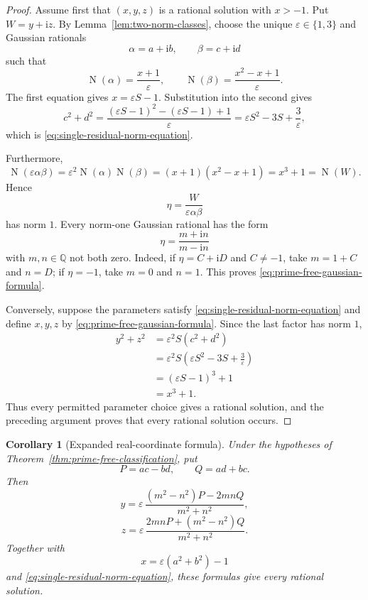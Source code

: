 \documentclass[11pt,a4paper]{article}
\numberwithin{equation}{section}
\newtheorem{corollary}[theorem]{Corollary}
\theoremstyle{definition}
\newcommand{\Q}{\mathbb Q}
\newcommand{\ii}{\mathrm i}
\newcommand{\N}{\operatorname N}
\begin{document}
\begin{proof}
Assume first that $(x,y,z)$ is a rational solution with $x>-1$.  Put
$W=y+\ii z$.  By Lemma~\ref{lem:two-norm-classes}, choose the unique
$\varepsilon\in\{1,3\}$ and Gaussian rationals
\[
 \alpha=a+\ii b,
 \qquad
 \beta=c+\ii d
\]
such that
\begin{equation}
 \N(\alpha)=\frac{x+1}{\varepsilon},
 \qquad
 \N(\beta)=\frac{x^2-x+1}{\varepsilon}.
 \label{eq:alpha-beta-norms}
\end{equation}
The first equation gives $x=\varepsilon S-1$.  Substitution into the second
gives
\[
 c^2+d^2
 =\frac{(\varepsilon S-1)^2-(\varepsilon S-1)+1}{\varepsilon}
 =\varepsilon S^2-3S+\frac3\varepsilon,
\]
which is \eqref{eq:single-residual-norm-equation}.

Furthermore,
\[
 \N(\varepsilon\alpha\beta)
 =\varepsilon^2\N(\alpha)\N(\beta)
 =(x+1)(x^2-x+1)
 =x^3+1
 =\N(W).
\]
Hence
\[
 \eta=\frac{W}{\varepsilon\alpha\beta}
\]
has norm $1$.  Every norm-one Gaussian rational has the form
\begin{equation}
 \eta=\frac{m+\ii n}{m-\ii n}
 \label{eq:hilbert90-param}
\end{equation}
with $m,n\in\Q$ not both zero.  Indeed, if
$\eta=C+\ii D$ and $C\ne-1$, take $m=1+C$ and $n=D$; if $\eta=-1$, take
$m=0$ and $n=1$.  This proves \eqref{eq:prime-free-gaussian-formula}.

Conversely, suppose the parameters satisfy
\eqref{eq:single-residual-norm-equation} and define $x,y,z$ by
\eqref{eq:prime-free-gaussian-formula}.  Since the last factor has norm $1$,
\begin{align*}
 y^2+z^2
 &=\varepsilon^2S(c^2+d^2)\\
 &=\varepsilon^2S\left(\varepsilon S^2-3S+\frac3\varepsilon\right)\\
 &=(\varepsilon S-1)^3+1\\
 &=x^3+1.
\end{align*}
Thus every permitted parameter choice gives a rational solution, and the
preceding argument proves that every rational solution occurs.
\end{proof}

\begin{corollary}[Expanded real-coordinate formula]
\label{cor:expanded-real}
Under the hypotheses of Theorem~\ref{thm:prime-free-classification}, put
\[
 P=ac-bd,
 \qquad
 Q=ad+bc.
\]
Then
\begin{equation}
 \boxed{
 y=\varepsilon\,
 \frac{(m^2-n^2)P-2mnQ}{m^2+n^2},
 }
 \label{eq:y-expanded}
\end{equation}
\begin{equation}
 \boxed{
 z=\varepsilon\,
 \frac{2mnP+(m^2-n^2)Q}{m^2+n^2}.
 }
 \label{eq:z-expanded}
\end{equation}
Together with
\[
 x=\varepsilon(a^2+b^2)-1
\]
and \eqref{eq:single-residual-norm-equation}, these formulas give every
rational solution.
\end{corollary}
\end{document}

